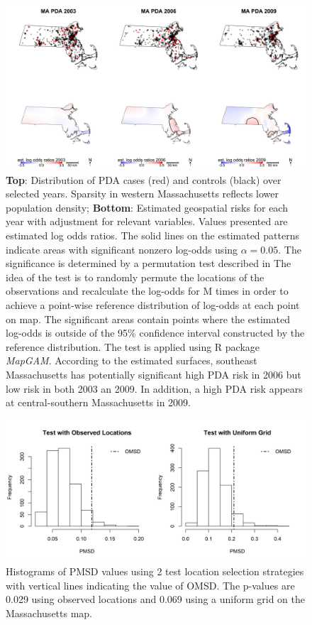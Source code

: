 	\begin{figure}[h]
		\centering
		\includegraphics[width=\linewidth]{Figures/Chap3/obnest201904.png}
		\caption{\textbf{Top}: Distribution of PDA cases (red) and controls (black) over selected years. Sparsity in western Massachusetts reflects lower population density; \textbf{Bottom}: Estimated geospatial risks for each year with adjustment for relevant variables. Values presented are estimated log odds ratios. The solid lines on the estimated patterns indicate areas with significant nonzero log-odds using $\alpha=0.05$. The significance is determined by a permutation test described in \cite{webster2006method} The idea of the test is to randomly permute the locations of the observations and recalculate the log-odds for M times in order to achieve a point-wise reference distribution of log-odds at each point on map. The significant areas contain points where the estimated log-odds is outside of the 95\% confidence interval constructed by the reference distribution. The test is applied using R package \emph{MapGAM}. \citep{bai2019mapgam} According to the estimated surfaces, southeast Massachusetts has potentially significant high PDA risk in 2006 but low risk in both 2003 an 2009. In addition, a high PDA risk appears at central-southern Massachusetts in 2009.}
		\label{fig:MAdist}
	\end{figure}
	
	\begin{figure}[h]
		\centering
		\includegraphics[width=0.9\linewidth]{Figures/Chap3/AppRes.png}
		\caption{Histograms of PMSD values using 2 test location selection strategies with vertical lines indicating the value of OMSD. The p-values are 0.029 using observed locations and 0.069 using a uniform grid on the Massachusetts map.}
		\label{fig:MApvalues}
	\end{figure}
	
